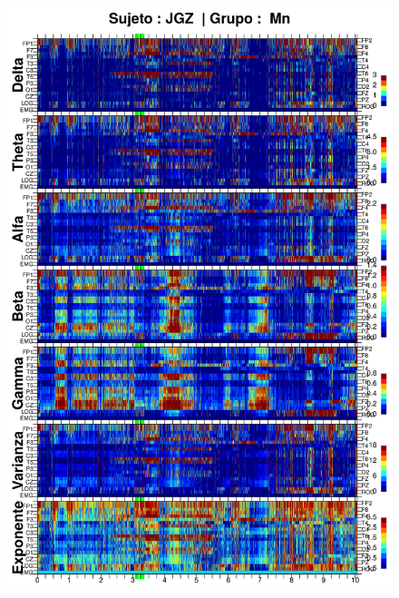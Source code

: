\begin{figure}
\centering
\includegraphics[width=0.9\linewidth]
{./img_resultados/JGMN6SUE_espectral_total.png} 
\end{figure}

